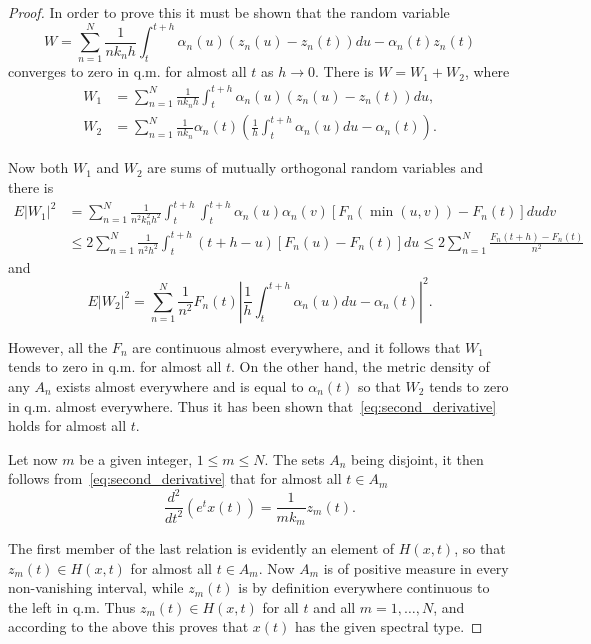 \documentclass[11pt]{article}
\begin{document}
\begin{proof}
In order to prove this it must be shown that the random variable
\begin{equation}
W = \sum_{n=1}^N \frac{1}{nk_n h} \int_t^{t+h} \alpha_n(u) (z_n(u) - z_n(t)) du - \alpha_n(t) z_n(t)
\label{eq:difference_quotient}
\end{equation}
converges to zero in q.m. for almost all $t$ as $h \to 0$. There is $W = W_1 + W_2$, where
\begin{align}
W_1 &= \sum_{n=1}^N \frac{1}{nk_n h} \int_t^{t+h} \alpha_n(u) (z_n(u) - z_n(t)) du, \label{eq:W1}\\
W_2 &= \sum_{n=1}^N \frac{1}{nk_n} \alpha_n(t) \left(\frac{1}{h} \int_t^{t+h} \alpha_n(u) du - \alpha_n(t)\right). \label{eq:W2}
\end{align}

Now both $W_1$ and $W_2$ are sums of mutually orthogonal random variables and there is
\begin{align}
E|W_1|^2 &= \sum_{n=1}^N \frac{1}{n^2 k_n^2 h^2} \int_t^{t+h} \int_t^{t+h} \alpha_n(u) \alpha_n(v) [F_n(\min(u,v)) - F_n(t)] du dv \nonumber \\
&\leq 2 \sum_{n=1}^N \frac{1}{n^2 h^2} \int_t^{t+h} (t+h-u)[F_n(u) - F_n(t)] du \leq 2 \sum_{n=1}^N \frac{F_n(t+h) - F_n(t)}{n^2} \label{eq:W1_bound}
\end{align}
and
\begin{equation}
E|W_2|^2 = \sum_{n=1}^N \frac{1}{n^2} F_n(t) \left|\frac{1}{h} \int_t^{t+h} \alpha_n(u) du - \alpha_n(t)\right|^2.
\label{eq:W2_bound}
\end{equation}

However, all the $F_n$ are continuous almost everywhere, and it follows that $W_1$ tends to zero in q.m. for almost all $t$. On the other hand, the metric density of any $A_n$ exists almost everywhere and is equal to $\alpha_n(t)$ so that $W_2$ tends to zero in q.m. almost everywhere. Thus it has been shown that~\eqref{eq:second_derivative} holds for almost all $t$.

Let now $m$ be a given integer, $1 \leq m \leq N$. The sets $A_n$ being disjoint, it then follows from~\eqref{eq:second_derivative} that for almost all $t \in A_m$
\begin{equation}
\frac{d^2}{dt^2}(e^t x(t)) = \frac{1}{mk_m} z_m(t).
\label{eq:component_derivative}
\end{equation}

The first member of the last relation is evidently an element of $H(x, t)$, so that $z_m(t) \in H(x, t)$ for almost all $t \in A_m$. Now $A_m$ is of positive measure in every non-vanishing interval, while $z_m(t)$ is by definition everywhere continuous to the left in q.m. Thus $z_m(t) \in H(x, t)$ for all $t$ and all $m = 1, \ldots, N$, and according to the above this proves that $x(t)$ has the given spectral type.


\end{proof}
\end{document}
